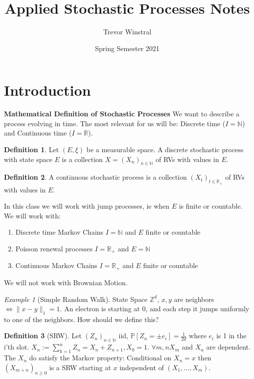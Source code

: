 \documentclass[12pt]{book}
\title{Applied Stochastic Processes Notes}
\author{Trevor Winstral}
\date{Spring Semester 2021}
\renewcommand{\iff}{\Leftrightarrow}
\theoremstyle{definition}
\newtheorem{defn}{Definition}[section]
\theoremstyle{remark}
\newtheorem{ex}{Example}[section]
\begin{document}
\maketitle
\tableofcontents 
\newpage

\section{Introduction}

\textbf{Mathematical Definition of Stochastic Processes} We want to describe a process evolving in time. The most relevant for us will be: Discrete time ($I=\mathbb{N}$) and Continuous time ($I=\mathbb{R}$).

\begin{defn}
	Let $(E, \xi)$ be a measurable space. A discrete stochastic process with state space $E$ is a collection $X=(X_n)_{n \in \mathbb{N}}$ of RVs with values in $E$.
\end{defn}

\begin{defn}
A continuous stochastic process is a collection $(X_t)_{t \in \mathbb{R}_+}$ of RVs with values in $E$.
\end{defn}

In this class we will work with jump processes, ie when $E$ is finite or countable.
We will work with:
\begin{enumerate}
	\item Discrete time Markov Chains $I=\mathbb{N}$ and $E$ finite or countable
	\item Poisson renewal processes $I=\mathbb{R}_{+}$ and $E= \mathbb{N} $
	\item Continuous Markov Chains $I= \mathbb{R}_{+}$ and $E$ finite or countable
\end{enumerate}
We will not work with Brownian Motion.

\begin{ex}[Simple Random Walk] 
	State Space $\mathbb{Z}^{d}$, $x,y$ are neighbors $\iff \|x-y\|_{1}=1$. An electron is starting at 0, and each step it jumps uniformly to one of the neighbors. How should we define this?

\end{ex}

\begin{defn}[SRW]
	Let $(Z_n)_{n \in \mathbb{N}}$ iid, $\mathbb{P} \left[ Z_n = \pm e_i \right] = \frac{1}{2d}$ where $e_i$ is 1 in the i'th slot. $X_n := \sum_{k=1}^n Z_n= X_n + Z_{n+1}, X_0=1$. $\forall m,n X_m$ and $X_n$ are dependent.  The $X_n$ do satisfy the Markov property: Conditional on $X_n=x$ then $(X_{m+n})_{n \geq 0}$ is a SRW starting at $x$ independent of $(X_1,...,X_m)$.
\end{defn}
\end{document}

